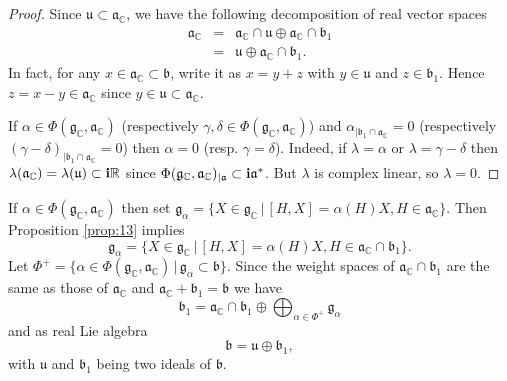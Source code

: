 \documentclass{amse-new}
\numberwithin{equation}{section} %
\begin{document}
\begin{proof}
Since $\mathfrak{u\subset\mathfrak{a}}_{\mathbb{C}}$, we have the following decomposition of real
vector spaces
\begin{eqnarray}
\mathfrak{a}_{\mathbb{C}}&=&\mathfrak{a}_{\mathbb{C}}\cap\mathfrak{u}
\oplus\mathfrak{a}_{\mathbb{C}}\cap\mathfrak{b}_{1}\nonumber\\
&=&\mathfrak{u}\oplus\mathfrak{a}_{\mathbb{C}}\cap\mathfrak{b}_{1}.\label{eq:a}
\end{eqnarray}
In fact, for any $x\in \mathfrak{a}_{\mathbb{C}}\subset \mathfrak{b}$, write it as $x=y+z$ with $y\in \mathfrak{u}$ and $z\in \mathfrak{b}_1$. Hence $z=x-y\in \mathfrak{a}_{\mathbb{C}}$ since $y\in \mathfrak{u}\subset \mathfrak{a}_{\mathbb{C}}$.

If $\alpha\in\Phi(\mathfrak{g}_{\mathbb{C}},\mathfrak{a}_{\mathbb{C}})$
(respectively $\gamma,\delta\in\Phi(\mathfrak{g}_{\mathbb{C}},\mathfrak{a}%
_{\mathbb{C}})$) and $\alpha_{|\mathfrak{b}_{1}\cap\mathfrak{a}_{\mathbb{C}}%
}=0 $ (respectively $\left(  \gamma-\delta\right)  _{|\mathfrak{b}_{1}%
\cap\mathfrak{a}_{\mathbb{C}}}=0$) then $\alpha=0$ (resp. $\gamma=\delta$).
Indeed, if $\lambda=\alpha$ or $\lambda=\gamma-\delta$ then $\lambda
(\mathfrak{a}_{\mathbb{C}})=\lambda(\mathfrak{u)}\subset{\bf{i}}\mathbb{R}$
since $\Phi(\mathfrak{g}_{\mathbb{C}},\mathfrak{a}_{\mathbb{C}}%
)_{|\mathfrak{a}}\subset{\bf{i}}\mathfrak{a}^{\ast}$. But $\lambda$ is
complex linear, so $\lambda=0$.
\end{proof}

If $\alpha\in\Phi(\mathfrak{g}_{\mathbb{C}},\mathfrak{a}_{\mathbb{C}})$ then
set $\mathfrak{g}_{\alpha}=\{X\in\mathfrak{g}_{\mathbb{C}}\, |\,
[H,X]=\alpha(H)X, H\in\mathfrak{a}_{\mathbb{C}}\}$. Then Proposition \ref{prop:13}
implies%
\[
\mathfrak{g}_{\alpha}=\{X\in\mathfrak{g}_{\mathbb{C}}\, |\, [H, X]=\alpha
(H)X,H\in\mathfrak{a}_{\mathbb{C}}\cap\mathfrak{b}_{1}\}.
\]
Let $\Phi^{+}=\{\alpha\in\Phi(\mathfrak{g}_{\mathbb{C}},\mathfrak{a}%
_{\mathbb{C}})\,|\, \mathfrak{g}_{\alpha}\subset\mathfrak{b}\}.$ Since the weight
spaces of $\mathfrak{a}_{\mathbb{C}}\cap\mathfrak{b}_{1}$ are the same as
those of $\mathfrak{a}_{\mathbb{C}}$ and $\mathfrak{a}_{\mathbb{C}%
}+\mathfrak{b}_{1}=\mathfrak{b}$ we have%
\[
\mathfrak{b}_{1}=\mathfrak{a}_{\mathbb{C}}\cap\mathfrak{b}_{1}\oplus
\bigoplus_{\alpha\in\Phi^{+}}\mathfrak{g}_{\alpha}%
\]
and as real Lie algebra
\begin{equation}\label{eq:main1}
\mathfrak{b}=\mathfrak{\mathfrak{u}}\oplus\mathfrak{b}_{1},
\end{equation}
with  $\mathfrak{u}$ and $\mathfrak{b}_1$ being two ideals of $\mathfrak{b}$.
\end{document}
